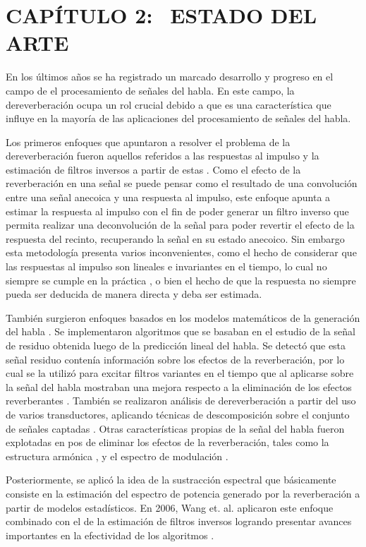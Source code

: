 \section[Estado del Arte]{CAPÍTULO 2:$\ \ \ \ $ESTADO DEL ARTE} 

En los últimos años se ha registrado un marcado desarrollo y progreso en el campo de el procesamiento de señales del habla. En este campo, la dereverberación ocupa un rol crucial debido a que es una característica que influye en la mayoría de las aplicaciones del procesamiento de señales del habla.

Los primeros enfoques que apuntaron a resolver el problema de la dereverberación fueron aquellos referidos a las respuestas al impulso y la estimación de filtros inversos a partir de estas \cite{filtros_inv}. Como el efecto de la reverberación en una señal se puede pensar como el resultado de una convolución entre una señal anecoica y una respuesta al impulso, este enfoque apunta a estimar la respuesta al impulso con el fin de poder generar un filtro inverso que permita realizar una deconvolución de la señal para poder revertir el efecto de la respuesta del recinto, recuperando la señal en su estado anecoico. Sin embargo esta metodología presenta varios inconvenientes, como el hecho de considerar que las respuestas al impulso son lineales e invariantes en el tiempo, lo cual no siempre se cumple en la práctica \cite{LTI}, o bien el hecho de que la respuesta no siempre pueda ser deducida de manera directa y deba ser estimada. 


También surgieron enfoques basados en los modelos matemáticos de la generación del habla \cite{rabiner}. Se implementaron algoritmos que se basaban en el estudio de la señal de residuo obtenida luego de la predicción lineal del habla. Se detectó que esta señal residuo contenía información sobre los efectos de la reverberación, por lo cual se la utilizó para excitar filtros variantes en el tiempo que al aplicarse sobre la señal del habla mostraban una mejora respecto a la eliminación de los efectos reverberantes \cite{LPresiduo}. También se realizaron análisis de dereverberación a partir del uso de varios transductores, aplicando  técnicas de descomposición sobre el conjunto de señales captadas \cite{multichannel}. Otras características propias de la señal del habla fueron explotadas en pos de eliminar los efectos de la reverberación, tales como la estructura armónica \cite{armonica}, y el espectro de modulación \cite{mod}. 

Posteriormente, se aplicó la idea de la sustracción espectral \cite{spect_subtrac} \cite{spect_subtrac2} que básicamente consiste en la estimación del espectro de potencia generado por la reverberación a partir de modelos estadísticos. En 2006, Wang et. al. aplicaron este enfoque combinado con el de la estimación de filtros inversos logrando presentar avances importantes en la efectividad de los algoritmos \cite{two_stage}.
 

